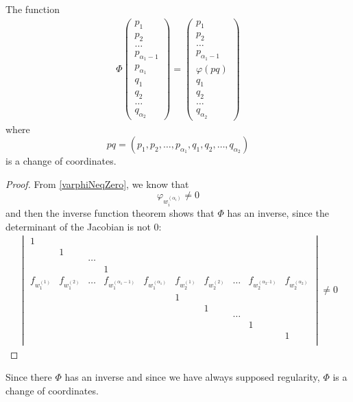 \documentclass[12pt]{article}
\begin{document}
\begin{lemma} \label{changeOfCoordinates}
 The function
 \begin{equation}\begin{aligned}
    \Phi
    \begin{pmatrix}
      p_1 \\ p_2 \\ \ldots \\ p_{\alpha_1 - 1} \\ p_{\alpha_1} \\ q_1 \\ q_2 \\ \ldots \\ q_{\alpha_2}
    \end{pmatrix}
    =
    \begin{pmatrix}
        p_1 \\ p_2 \\ \ldots \\ p_{\alpha_1 - 1} \\ \varphi(pq) \\ q_1 \\ q_2 \\ \ldots \\ q_{\alpha_2}
    \end{pmatrix}
  \end{aligned}\end{equation}
  where 
  \[ pq = (p_1, p_2, \ldots, p_{\alpha_1}, q_1, q_2, \ldots, q_{\alpha_2}) \]
  is a change of coordinates.
\end{lemma}
\begin{proof}
From \ref{varphiNeqZero}, we know that
\[  \varphi_{w_i^{(\alpha_i)}} \neq 0 \]
and then the inverse function theorem shows that $\Phi$ has an inverse, since the determinant of the Jacobian
is not $0$:
\begin{align*}
  \begin{vmatrix}
    1	&		&		&		&		&		&		&		&		&		\\
	&	1	&		&		&		&		&		&		&		&		\\
	&		&	\ldots	&		&		&		&		&		&		&		\\
	&		&		&	1	&		&		&		&		&		&		\\
f_{w_1^{(1)}}	&	f_{w_1^{(2)}}	&	\ldots	&	f_{w_1^{(\alpha_1-1)}}	&	f_{w_1^{(\alpha_1)}}	&	f_{w_2^{(1)}}	&	f_{w_2^{(2)}}	&	\dots	&	f_{w_2^{(\alpha_2 – 1)}}	&	f_{w_2^{(\alpha_2)}}	\\
	&		&		&		&		&	1	&		&		&		&		\\
	&		&		&		&		&		&	1	&		&		&		\\
	&		&		&		&		&		&		&	\dots	&		&		\\
	&		&		&		&		&		&		&		&	1	&		\\
	&		&		&		&		&		&		&		&		&	1	\\
  \end{vmatrix}
  \neq 0
\end{align*}
\end{proof}
Since there $\Phi$ has an inverse and since we have always supposed regularity, $\Phi$ is a change of coordinates.
\end{document}
